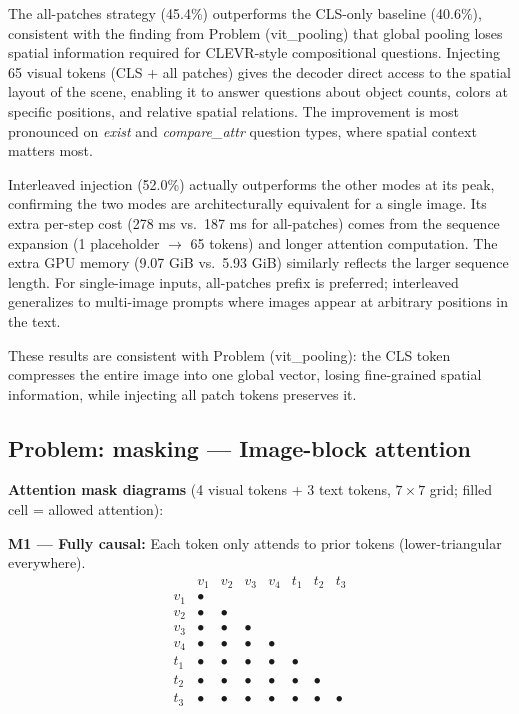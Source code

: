 \documentclass[11pt]{article}
\begin{document}
The all-patches strategy (45.4\%) outperforms the CLS-only baseline
(40.6\%), consistent with the finding from Problem (vit\_pooling) that
global pooling loses spatial information required for CLEVR-style
compositional questions.  Injecting 65 visual tokens (CLS + all patches)
gives the decoder direct access to the spatial layout of the scene,
enabling it to answer questions about object counts, colors at specific
positions, and relative spatial relations.  The improvement is most
pronounced on \textit{exist} and \textit{compare\_attr} question types,
where spatial context matters most.

Interleaved injection (52.0\%) actually outperforms the other modes at its peak,
confirming the two modes are architecturally equivalent for a single image.
Its extra per-step cost (278 ms vs.\ 187 ms for all-patches) comes from the
sequence expansion (1 placeholder $\to$ 65 tokens) and longer attention
computation. The extra GPU memory (9.07 GiB vs.\ 5.93 GiB) similarly
reflects the larger sequence length.  For single-image inputs, all-patches
prefix is preferred; interleaved generalizes to multi-image prompts where
images appear at arbitrary positions in the text.

These results are consistent with Problem (vit\_pooling): the CLS token
compresses the entire image into one global vector, losing fine-grained
spatial information, while injecting all patch tokens preserves it.

\subsection*{Problem: masking --- Image-block attention}

\textbf{Attention mask diagrams} (4 visual tokens + 3 text tokens, $7\times7$
grid; filled cell = allowed attention):

\medskip
\noindent\textbf{M1 --- Fully causal:}
Each token only attends to prior tokens (lower-triangular everywhere).
\[
\begin{array}{c|ccccccc}
     & v_1 & v_2 & v_3 & v_4 & t_1 & t_2 & t_3 \\\hline
v_1  & \bullet & & & & & & \\
v_2  & \bullet & \bullet & & & & & \\
v_3  & \bullet & \bullet & \bullet & & & & \\
v_4  & \bullet & \bullet & \bullet & \bullet & & & \\
t_1  & \bullet & \bullet & \bullet & \bullet & \bullet & & \\
t_2  & \bullet & \bullet & \bullet & \bullet & \bullet & \bullet & \\
t_3  & \bullet & \bullet & \bullet & \bullet & \bullet & \bullet & \bullet \\
\end{array}
\]
\end{document}
